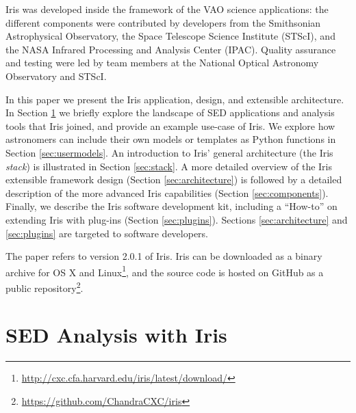 \documentclass[preprint,authoryear,5p]{elsarticle}
\begin{document}
Iris was developed inside the framework of the VAO science applications: the
different components were contributed by developers from the Smithsonian
Astrophysical Observatory, the Space Telescope Science Institute (STScI), and the NASA
Infrared Processing and Analysis Center (IPAC). Quality assurance and testing were led
by team members at the National Optical Astronomy Observatory and STScI.


In this paper we present the Iris application, design, and extensible architecture. In Section
\ref{sec:overview} we briefly explore the landscape of SED applications and
analysis tools that Iris joined, and provide an example use-case of Iris. We
explore how astronomers can include their own models or templates as Python
functions in Section \ref{sec:usermodels}. An introduction to Iris' general
architecture (the Iris \emph{stack}) is illustrated in Section \ref{sec:stack}.
A more detailed overview of the Iris extensible framework design (Section
\ref{sec:architecture}) is followed by a detailed description of the more
advanced Iris capabilities (Section \ref{sec:components}). Finally, we
describe the Iris software development kit, including a ``How-to'' on extending
Iris with plug-ins (Section \ref{sec:plugins}). Sections \ref{sec:architecture} and 
\ref{sec:plugins} are targeted to software
developers.

The paper refers to version 2.0.1 of Iris. Iris can be downloaded as a binary
archive for OS X and
Linux\footnote{\url{http://cxc.cfa.harvard.edu/iris/latest/download/}}, and the
source code is hosted on GitHub as a public
repository\footnote{\url{https://github.com/ChandraCXC/iris}}.

\section{SED Analysis with Iris} \label{sec:overview}
\end{document}
